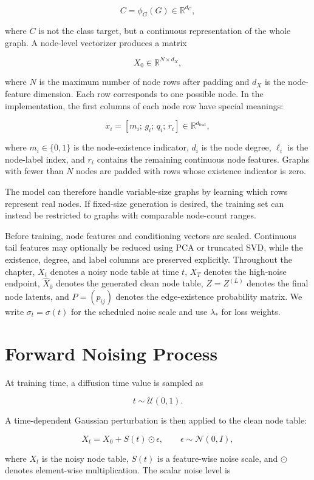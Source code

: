 \[
C = \phi_G(G) \in \mathbb{R}^{d_C},
\]

where \(C\) is not the class target, but a continuous representation of the
whole graph. A node-level vectorizer produces a matrix

\[
X_0 \in \mathbb{R}^{N \times d_X},
\]

where \(N\) is the maximum number of node rows after padding and \(d_X\) is the
node-feature dimension. Each row corresponds to one possible node. In the
implementation, the first columns of each node row have special meanings:

\[
x_i
=
\left[
m_i;\,
g_i;\,
q_i;\,
r_i
\right]
\in\mathbb{R}^{d_{\mathrm{feat}}},
\]

where \(m_i \in \{0,1\}\) is the node-existence indicator, \(d_i\) is the node
degree, \(\ell_i\) is the node-label index, and \(r_i\) contains the remaining
continuous node features. Graphs with fewer than \(N\) nodes are padded with
rows whose existence indicator is zero.

The model can therefore handle variable-size graphs by learning which rows
represent real nodes. If fixed-size generation is desired, the training set can
instead be restricted to graphs with comparable node-count ranges.

Before training, node features and conditioning vectors are scaled. Continuous
tail features may optionally be reduced using PCA or truncated SVD, while the
existence, degree, and label columns are preserved explicitly.
Throughout the chapter, \(X_t\) denotes a noisy node table at time \(t\),
\(X_T\) denotes the high-noise endpoint, \(\hat X_0\) denotes the generated
clean node table, \(Z=Z^{(L)}\) denotes the final node latents, and
\(P=(p_{ij})\) denotes the edge-existence probability matrix. We write
\(\sigma_t=\sigma(t)\) for the scheduled noise scale and use
\(\lambda_{\ast}\) for loss weights.
\section{Forward Noising Process}
\label{sec:generator:forward}

At training time, a diffusion time value is sampled as

\[
t \sim \mathcal{U}(0,1).
\]

A time-dependent Gaussian perturbation is then applied to the clean node table:

\[
X_t = X_0 + S(t) \odot \epsilon,
\qquad
\epsilon \sim \mathcal{N}(0,I),
\]

where \(X_t\) is the noisy node table, \(S(t)\) is a feature-wise noise scale,
and \(\odot\) denotes element-wise multiplication. The scalar noise level is

